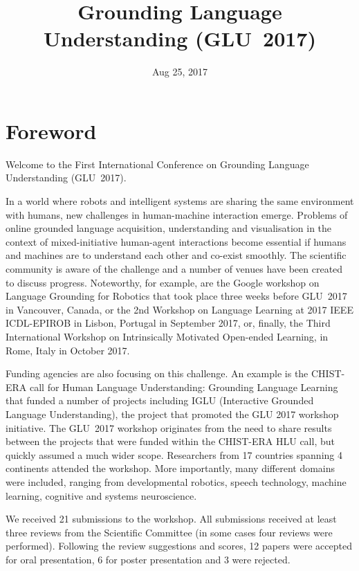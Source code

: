 \documentclass{confproc}
\title{Grounding Language Understanding (GLU~2017)}
\date{Aug 25, 2017}
\begin{document}
\maketitle
\newpage
\section*{Foreword}
Welcome to the First International Conference on Grounding Language Understanding (GLU~2017).

In a world where robots and intelligent systems are sharing the same environment with humans, new challenges in human-machine interaction emerge.
Problems of online grounded language acquisition, understanding and visualisation in the context of mixed-initiative human-agent interactions become essential if humans and machines are to understand each other and co-exist smoothly.
The scientific community is aware of the challenge and a number of venues have been created to discuss progress.
Noteworthy, for example, are the Google workshop on Language Grounding for Robotics that took place three weeks before GLU~2017 in Vancouver, Canada, or the 2nd Workshop on Language Learning at 2017 IEEE ICDL-EPIROB in Lisbon, Portugal in September 2017, or, finally, the Third International Workshop on Intrinsically Motivated Open-ended Learning, in Rome, Italy in October 2017.

Funding agencies are also focusing on this challenge.
An example is the CHIST-ERA call for Human Language Understanding: Grounding Language Learning that funded a number of projects including IGLU (Interactive Grounded Language Understanding), the project that promoted the GLU 2017 workshop initiative.
The GLU~2017 workshop originates from the need to share results between the projects that were funded within the CHIST-ERA HLU call, but quickly assumed a much wider scope.
Researchers from 17 countries spanning 4 continents attended the workshop.
More importantly, many different domains were included, ranging from developmental robotics, speech technology, machine learning, cognitive and systems neuroscience.

We received 21 submissions to the workshop. All submissions received at least three reviews from the Scientific Committee (in some cases four reviews were performed). Following the review suggestions and scores, 12 papers were accepted for oral presentation, 6 for poster presentation and 3 were rejected.
\end{document}
